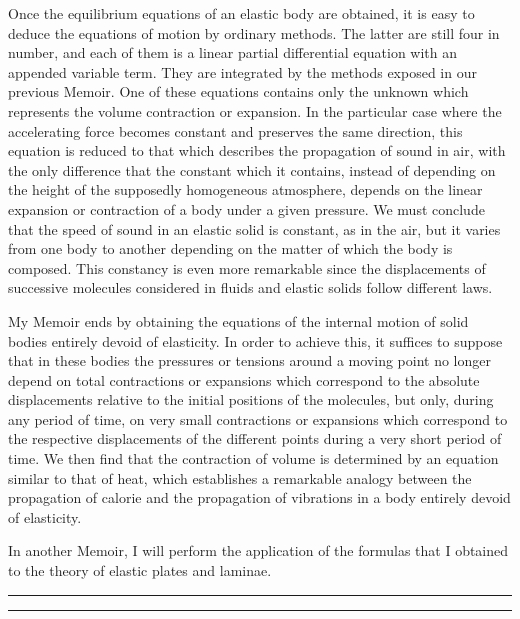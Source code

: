 \documentclass[openright,smallroyalvopaper,8pt,twoside,showtrims]{memoir}
\begin{document}
Once the equilibrium equations of an elastic body are obtained, it is easy to deduce the equations of motion by ordinary methods. The latter are still four in number, and each of them is a linear partial differential equation with an appended  variable term. They are integrated by the methods exposed in our previous Memoir. One of these equations contains only the unknown which represents the volume contraction or expansion. In the particular case where the accelerating force becomes constant and preserves the same direction, this equation is reduced to that which describes the propagation of sound in air, with the only difference that the constant which it contains, instead of depending on the height of the supposedly homogeneous atmosphere, depends on the linear expansion or contraction of a body under a given pressure. We must conclude that the speed of sound in an elastic solid is constant, as in the air, but it varies from one body to another depending on the matter of which the body is composed. This constancy is even more remarkable since the displacements of successive molecules considered in fluids and elastic solids follow different laws.

My Memoir ends by obtaining the equations of the internal motion of solid bodies entirely devoid of elasticity. In order to achieve this, it suffices to suppose that in these bodies the pressures or tensions around a moving point no longer depend on total contractions or expansions which correspond to the absolute displacements relative to the initial positions of the molecules, but only, during any period of time, on very small contractions or expansions which correspond to the respective displacements of the different points during a very short period of time. We then find that the contraction of volume is determined by an equation similar to that of heat, which establishes a remarkable analogy between the propagation of calorie and the propagation of vibrations in a body entirely devoid of elasticity.

In another Memoir, I will perform the application of the formulas that I obtained to the theory of elastic plates and laminae.

\vspace*{.5cm}
\noindent
\rule{\textwidth}{0.5pt}\vspace*{-\baselineskip}\vspace*{2pt} 
\rule{\textwidth}{0.5pt} 
\end{document}
